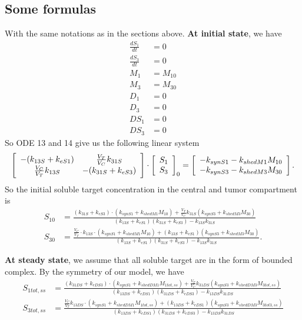 \subsection{Some formulas}
With the same notations as in the sections above.\newline 
\textbf{At initial state}, we have
\begin{align*}
    \frac{dS_1}{dt} & = 0 \\
    \frac{dS_3}{dt} & = 0 \\
                M_1 & = M_{10} \\
                M_3 & = M_{30} \\
                D_1 & = 0 \\
                D_3 & = 0 \\
               DS_1 & = 0 \\
               DS_3 & = 0 
\end{align*}
So ODE 13 and 14 give us the following linear system
\[
    \left[\begin{array}{cc} {-(k_{13S} + k_{eS1})} & {\frac{V_T}{V_C}k_{31S}} \\ {\frac{V_C}{V_T}k_{13S}} & {-(k_{31S} + k_{eS3})} \end{array}\right]
        \cdot \left[\begin{array}{c} {S_1} \\ {S_3} \end{array}\right]_0 = \left[\begin{array}{c} {-k_{synS1} - k_{shedM1}M_{10}} \\ {-k_{synS3} - k_{shedM3}M_{30}} \end{array}\right].
\]
So the initial soluble target concentration in the central and tumor compartment is
\begin{align}
    S_{10} & = \frac{(k_{31S} + k_{eS3})\cdot(k_{synS1} + k_{shedM1}M_{10})
                    + \frac{V_T}{V_C}k_{31S}(k_{synS3} + k_{shedM3}M_{30})}
                {(k_{13S} + k_{eS1})(k_{31S} + k_{eS3}) - k_{13S}k_{31S}} \\
    S_{30} & = \frac{\frac{V_C}{V_T}\cdot k_{13S}\cdot(k_{synS1} + k_{shedM1}M_{10})
                    + (k_{13S} + k_{eS1})(k_{synS3} + k_{shedM3}M_{30})}
            {(k_{13S} + k_{eS1})(k_{31S} + k_{eS3}) - k_{13S}k_{31S}}.
\end{align}

\textbf{At steady state}, we assume that all soluble target are in the form of bounded complex.
By the symmetry of our model, we have
\begin{align*}
    S_{1tot,ss} & = \frac{(k_{31DS} + k_{eDS3})\cdot(k_{synS1} + k_{shedDM1}M_{1tot,ss})
                    + \frac{V_T}{V_C}k_{31DS}(k_{synS3} + k_{shedDM3}M_{3tot,ss})}
                {(k_{13DS} + k_{eDS1})(k_{31DS} + k_{eDS3}) - k_{13DS}k_{31DS}} \\
    S_{3tot,ss} & = \frac{\frac{V_C}{V_T} k_{13DS}\cdot(k_{synS1} + k_{shedDM1}M_{1tot,ss})
                    + (k_{13DS} + k_{eDS1})(k_{synS3} + k_{shedDM3}M_{3tot3,ss})}
            {(k_{13DS} + k_{eDS1})(k_{31DS} + k_{eDS3}) - k_{13DS}k_{31DS}}
\end{align*}

